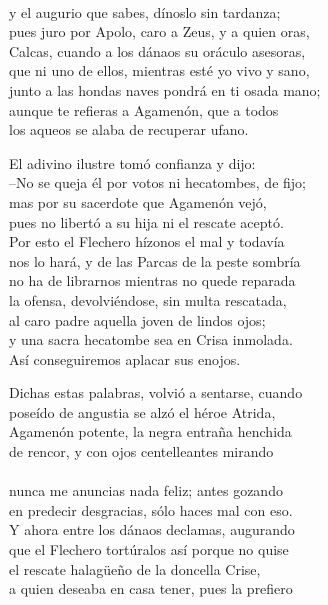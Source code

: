 \\
y el augurio que sabes, dínoslo sin tardanza;\\
pues juro por Apolo, caro a Zeus, y a quien oras,\\
Calcas, cuando a los dánaos su oráculo asesoras,\\
que ni uno de ellos, mientras esté yo vivo y sano,\\
junto a las hondas naves pondrá en ti osada mano;\\
aunque te refieras a Agamenón, que a todos\\
los aqueos se alaba de recuperar ufano.\par
El adivino ilustre tomó confianza y dijo:\\
--No se queja él por votos ni hecatombes, de fijo;\\
mas por su sacerdote que Agamenón vejó,\\
pues no libertó a su hija ni el rescate aceptó.\\
Por esto el Flechero hízonos el mal y todavía\\
nos lo hará, y de las Parcas de la peste sombría\\
no ha de librarnos mientras no quede reparada\\
la ofensa, devolviéndose, sin multa rescatada,\\
al caro padre aquella joven de lindos ojos;\\
y una sacra hecatombe sea en Crisa inmolada.\\
Así conseguiremos aplacar sus enojos.\par
Dichas estas palabras, volvió a sentarse, cuando\\
poseído de angustia se alzó el héroe Atrida,\\
Agamenón potente, la negra entraña henchida\\
de rencor, y con ojos centelleantes mirando\\
\\
nunca me anuncias nada feliz; antes gozando\\
en predecir desgracias, sólo haces mal con eso.\\
Y ahora entre los dánaos declamas, augurando\\
que el Flechero tortúralos así porque no quise\\
el rescate halagüeño de la doncella Crise,\\
a quien deseaba en casa tener, pues la prefiero\\
